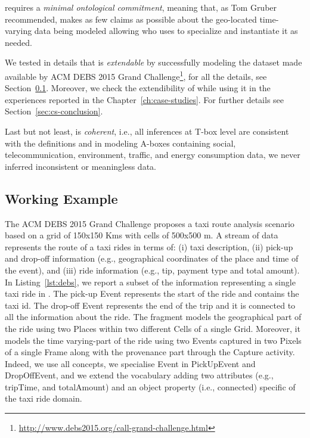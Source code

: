 \frappe{} requires a \textit{minimal ontological commitment}, meaning that, as Tom Gruber recommended, \frappe{} makes as few claims as possible about the geo-located time-varying data being modeled allowing who uses \frappe{} to specialize and instantiate it as needed.

We tested in details that \frappe{} is \textit{extendable} by successfully modeling the dataset made available by ACM DEBS 2015 Grand Challenge\footnote{\url{http://www.debs2015.org/call-grand-challenge.html}}, for all the details, see Section~\ref{sec:conc-fr-1-synth-ex}.
Moreover, we check the extendibility of \frappe{} while using it in the experiences reported in the Chapter~\ref{ch:case-studies}. For further details see Section~\ref{sec:cs-conclusion}.

Last but not least, \frappe{} is \textit{coherent}, i.e., all \frappe{} inferences at T-box level are consistent with the definitions and in modeling A-boxes containing social, telecommunication, environment, traffic, and energy consumption data, we never inferred inconsistent or meaningless data.

\subsection{Working Example} \label{sec:conc-fr-1-synth-ex}

The ACM DEBS 2015 Grand Challenge proposes a taxi route analysis scenario based on a grid of 150x150 Kms with cells of 500x500 m. A stream of data represents the route of a taxi rides in terms of: (i) taxi description, (ii) pick-up and drop-off information (e.g., geographical coordinates of the place and time of the event), and (iii) ride information (e.g., tip, payment type and total amount).
In Listing~\ref{lst:debs}, we report a subset of the information representing a single taxi ride in \frappe{}. The pick-up \textsf{Event} represents the start of the ride and contains the taxi id. The drop-off \textsf{Event} represents the end of the trip and it is connected to all the information about the ride. The fragment models the geographical part of the ride using two \textsf{Place}s within two different \textsf{Cell}s of a single \textsf{Grid}. Moreover, it models the time varying-part of the ride using two \textsf{Event}s captured in two \textsf{Pixel}s of a single \textsf{Frame} along with the provenance part through the \textsf{Capture} activity. Indeed, we use all \frappe{} concepts, we specialise \textsf{Event} in \textsf{PickUpEvent} and \textsf{DropOffEvent}, and we extend the vocabulary adding two attributes (e.g., \textsf{tripTime}, and \textsf{totalAmount}) and an object property (i.e., \textsf{connected}) specific of the taxi ride domain.

